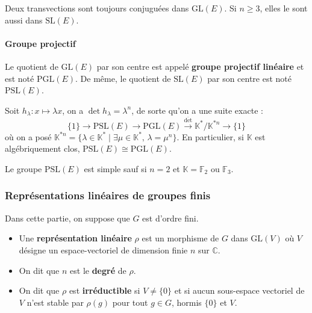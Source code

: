	\begin{proposition}
		Deux transvections sont toujours conjuguées dans $\mathrm{GL}(E)$. Si $n \geq 3$, elles le sont aussi dans $\mathrm{SL}(E)$.
	\end{proposition}

	\paragraph{Groupe projectif}

	\begin{definition}
		Le quotient de $\mathrm{GL}(E)$ par son centre est appelé \textbf{groupe projectif linéaire} et est noté $\mathrm{PGL}(E)$. De même, le quotient de $\mathrm{SL}(E)$ par son centre est noté $\mathrm{PSL}(E)$.
	\end{definition}

	\begin{remark}
		Soit $h_\lambda : x \mapsto \lambda x$, on a $\det h_\lambda = \lambda^n$, de sorte qu'on a une suite exacte :
		\[ \{ 1 \} \rightarrow \mathrm{PSL}(E) \rightarrow \mathrm{PGL}(E) \xrightarrow{\overline{\det}} \mathbb{K}^*/\mathbb{K}^{*n} \rightarrow \{ 1 \} \]
		où on a posé $\mathbb{K}^{*n} = \{ \lambda \in \mathbb{K}^* \mid \exists \mu \in \mathbb{K}^*, \, \lambda = \mu^n \}$. En particulier, si $\mathbb{K}$ est algébriquement clos, $\mathrm{PSL}(E) \cong \mathrm{PGL}(E)$.
	\end{remark}

	\begin{theorem}
		Le groupe $\mathrm{PSL}(E)$ est simple sauf si $n = 2$ et $\mathbb{K} = \mathbb{F}_2$ ou $\mathbb{F}_3$.
	\end{theorem}

	\subsubsection{Représentations linéaires de groupes finis}


	Dans cette partie, on suppose que $G$ est d'ordre fini.

	\begin{definition}
		\begin{itemize}
			\item Une \textbf{représentation linéaire} $\rho$ est un morphisme de $G$ dans $\mathrm{GL}(V)$ où $V$ désigne un espace-vectoriel de dimension finie $n$ sur $\mathbb{C}$.
			\item On dit que $n$ est le \textbf{degré} de $\rho$.
			\item On dit que $\rho$ est \textbf{irréductible} si $V \neq \{ 0 \}$ et si aucun sous-espace vectoriel de $V$ n'est stable par $\rho(g)$ pour tout $g \in G$, hormis $\{ 0 \}$ et $V$.
		\end{itemize}
	\end{definition}


